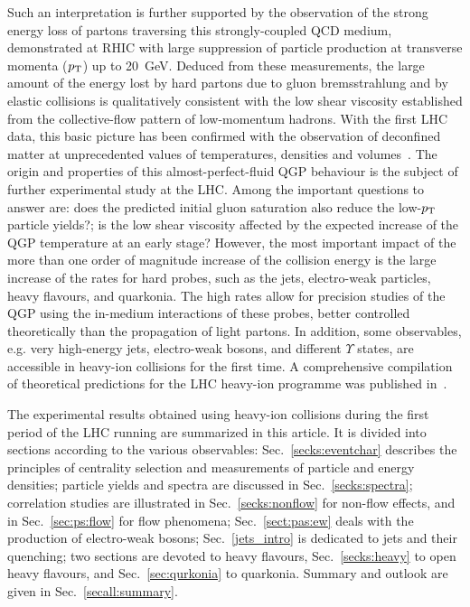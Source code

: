 Such an interpretation is further supported by the observation of the strong energy loss of partons traversing this strongly-coupled QCD medium, demonstrated at RHIC with large suppression of particle production at transverse momenta ($p_{\rm T}$) up to 20~GeV. Deduced from these measurements, the large amount of the energy lost by hard partons due to gluon bremsstrahlung and by elastic collisions is qualitatively consistent with the low shear viscosity established from the collective-flow pattern of low-momentum hadrons. With the first LHC data, this basic picture has been confirmed with the observation of deconfined matter at unprecedented values of temperatures, densities and volumes~\cite{Muller:2012zq}. The origin and properties of this almost-perfect-fluid QGP behaviour  is the subject of further experimental study at the LHC. Among the important questions to answer are: does the predicted initial gluon saturation also reduce the low-$p_{\rm T}$ particle yields?; is the low shear viscosity affected by the expected increase of the QGP temperature at an early stage? However, the most important impact of the more than one order of magnitude increase of the collision energy is the large increase of the rates for hard probes, such as the jets, electro-weak particles, heavy flavours, and quarkonia. The high rates allow for precision studies of the QGP using the in-medium interactions of these probes, better controlled theoretically than the propagation of light partons. In addition, some observables, e.g. very high-energy jets, electro-weak bosons, and different $\Upsilon$ states, are accessible in heavy-ion collisions for the first time. A comprehensive compilation of theoretical predictions for the LHC heavy-ion programme was published in~\cite{Abreu:2007kv}.

The experimental results obtained using heavy-ion collisions during the first period of the LHC running are summarized in this article. It is divided into sections according to the various observables: Sec.~\ref{secks:eventchar} describes the principles of centrality selection and measurements of particle and energy densities; particle yields and spectra are discussed in Sec.~\ref{secks:spectra}; correlation studies are illustrated in Sec.~\ref{secks:nonflow} for non-flow effects, and in Sec.~\ref{sec:ps:flow} for flow phenomena; Sec.~\ref{sect:pas:ew} deals with the production of electro-weak bosons; Sec.~\ref{jets_intro} is dedicated to jets and their quenching; two sections are devoted to heavy flavours, Sec.~\ref{secks:heavy} to open heavy flavours, and Sec.~\ref{sec:qurkonia} to quarkonia. Summary and outlook are given in Sec.~\ref{secall:summary}.


